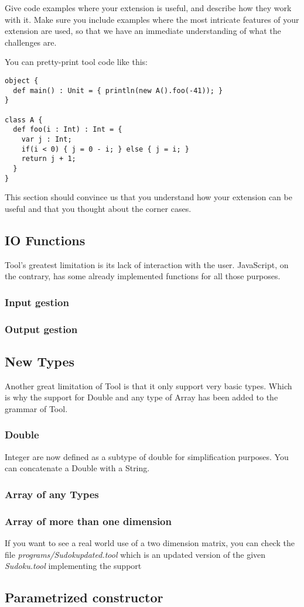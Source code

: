 Give code examples where your extension is useful, and describe how they work
with it. Make sure you include examples where the most intricate features of
your extension are used, so that we have an immediate understanding of what the
challenges are.

You can pretty-print tool code like this:
\begin{lstlisting}
object {
  def main() : Unit = { println(new A().foo(-41)); }
}

class A {
  def foo(i : Int) : Int = {
    var j : Int;
    if(i < 0) { j = 0 - i; } else { j = i; }
    return j + 1;
  }
}
\end{lstlisting}

This section should convince us that you understand how your extension can be
useful and that you thought about the corner cases.

\subsection{IO Functions}
Tool's greatest limitation is its lack of interaction with the user. JavaScript, on the  contrary, has some already implemented functions for all those purposes.
\subsubsection{Input gestion}
\subsubsection{Output gestion}

\subsection{New Types}
Another great limitation of Tool is that it only support very basic types. Which is why the support for Double and any type of Array has been added to the grammar of Tool.
\subsubsection{Double}
Integer are now defined as a subtype of double for simplification purposes.
You can concatenate a Double with a String.
\subsubsection{Array of any Types}
\subsubsection{Array of more than one dimension}
If you want to see a real world use of a two dimension matrix, you can check the file \emph{programs/Sudokupdated.tool} which is an updated version of the given \emph{Sudoku.tool} implementing the support
\subsection{Parametrized constructor}


